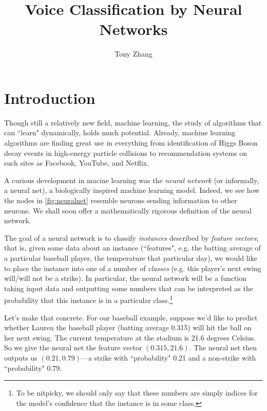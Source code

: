 \documentclass[10pt]{article}
\title{Voice Classification by Neural Networks}
\author{Tony Zhang}
\begin{document}
\maketitle

\begin{abstract}
% 
\end{abstract}

\section{Introduction}


Though still a relatively new field, machine learning, the study of algorithms that can ``learn" dynamically, holds much potential.
Already, machine learning algorithms are finding great use in everything from identification of Higgs Boson decay events in high-energy particle collisions to recommendation systems on such sites as Facebook, YouTube, and Netflix.

A curious development in macine learning was the \emph{neural network} (or informally, a neural net), a biologically inspired machine learning model.
Indeed, we see how the nodes in \cref{fig:neuralnet} resemble neurons sending information to other neurons.
We shall soon offer a mathematically rigorous definition of the neural network.

The goal of a neural network is to classify \emph{instances} described by \emph{feature vectors}; that is, given some data about an instance (``features", e.g. the batting average of a particular baseball player, the temperature that particular day), we would like to place the instance into one of a number of \emph{classes} (e.g. this player's next swing will/will not be a strike).
In particular, the neural network will be a function taking input data and outputting some numbers that can be interpreted as the probability that this instance is in a particular class.\footnote{To be nitpicky, we should only say that these numbers are simply indices for the model's confidence that the instance is in some class.}

Let's make that concrete.
For our baseball example, suppose we'd like to predict whether Lauren the baseball player (batting average 0.315) will hit the ball on her next swing.
The current temperature at the stadium is 21.6 degrees Celsius.
So we give the neural net the feature vector $(0.315, 21.6)$.
The neural net then outputs us $(0.21, 0.79)$---a strike with ``probability" 0.21 and a non-strike with ``probability" 0.79.
\end{document}
